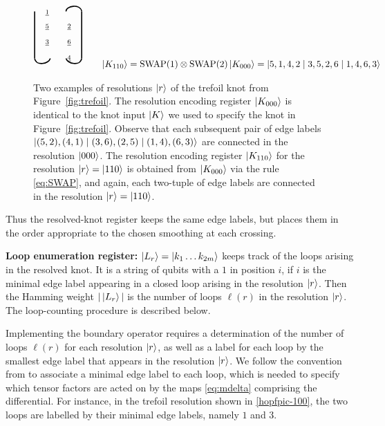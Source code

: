 \documentclass[a4paper,onecolumn,unpublished]{quantumarticle}
\theoremstyle{plain}
\theoremstyle{definition}
\theoremstyle{definition}
\numberwithin{equation}{section}
\begin{document}
\begin{figure}
{\begin{align}
{\begin{tikzpicture}[scale=.6]
  \draw [ very thick]    (2,4) .. controls +(0,.35) and +(-.1,.5) .. (3,4);
  \draw [ very thick]    (0,4) -- (0,1);
  \draw [ very thick]    (3,4) -- (3,1);
  \draw [ very thick]    (1,1) .. controls +(-0.1,-0.35) and+(+0.1,-0.5) .. (0,1);
  \draw [ very thick]    (2,1) .. controls +(0.1,-0.35) and +(-0.1,-0.5) .. (3,1);
  \node at (.8,3.9) {$\scriptstyle\underline{1}$};
   \node at (2.2,3) {$\scriptstyle\underline{2}$};
   \node at (2.2,2) {$\scriptstyle\underline{6}$};
   \node at (.8,3) {$\scriptstyle\underline{5}$};
   \node at (2.2,1) {$\scriptstyle\underline{4}$};
   \node at (.8,2) {$\scriptstyle\underline{3}$};
    \end{tikzpicture}  }
    \qquad
\ket{K_{110}} =  \text{SWAP}(1)\otimes\text{SWAP}(2) \ket{K_{000}}
= \ket{ 5,1, 4,2 \mid 3,5,2,6 \mid 1,4,6,3 }
\end{align} 
 }

    \caption{\justifying Two examples of resolutions $\ket{r}$ of the trefoil knot from Figure~\ref{fig:trefoil}.   The resolution encoding register $\ket{ K_{000} }$ is identical to the knot input $\ket{K}$ we used to specify the knot in Figure~\ref{fig:trefoil}. Observe that each subsequent pair of edge labels $\ket{ (5,2), (4,1) \mid (3,6), (2,5) \mid (1,4),(6,3)}$ are connected in the resolution $\ket{000}$.  The resolution encoding register $\ket{K_{110}}$ for the resolution $\ket{r}=\ket{110}$ is obtained from $\ket{K_{000}}$ via the rule \cref{eq:SWAP}, and again, each two-tuple of edge labels are connected in the resolution $\ket{r}=\ket{110}$.   }
     \label{fig:hr}
 \end{figure}

Thus the resolved-knot register keeps the same edge labels, but places them in the order appropriate to the chosen smoothing at each crossing.


\smallskip
\noindent \textbf{Loop enumeration register:} $\ket{L_r} = \ket{k_1 \dots k_{2m} }$ keeps track of the loops arising in the resolved knot. It is a string of qubits with a $1$ in position $i$, if $i$ is the minimal edge label appearing in a closed loop arising in the resolution $\ket{r}$.   Then the Hamming weight $|\ket{L_r}|$ is the number of loops $\ell(r)$ in the resolution $\ket{r}$.   The loop-counting procedure is described below.

Implementing the boundary operator requires a determination of the number of loops $\ell(r)$ for each resolution $\ket{r}$, as well as a label for each loop by the smallest edge label that appears in the resolution $\ket{r}$. 
We follow the convention from \cite{BN1} to associate a minimal edge label to each loop, which is needed to specify which tensor factors are acted on by the maps \cref{eq:mdelta} comprising the differential. 
For instance, in the trefoil resolution shown in \cref{hopfpic-100}, the two loops are labelled by their minimal edge labels, namely $1$ and $3$.
\end{document}
